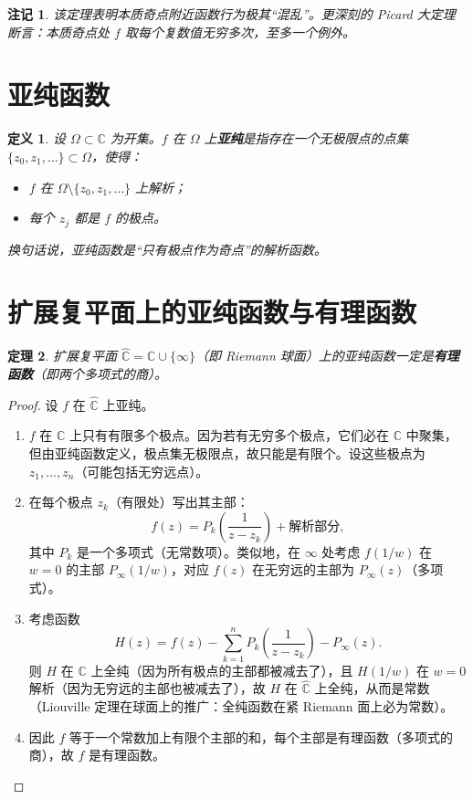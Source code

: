 \documentclass[UTF8]{ctexart}
\newtheorem{theorem}{定理}[section]
\newtheorem{definition}[theorem]{定义}
\newtheorem{remark}{注记}[section]
\numberwithin{equation}{section}
\newcommand{\CC}{\mathbb{C}}
\begin{document}
\begin{remark}
该定理表明本质奇点附近函数行为极其“混乱”。更深刻的 Picard 大定理断言：本质奇点处 \(f\) 取每个复数值无穷多次，至多一个例外。
\end{remark}

\section{亚纯函数}
\begin{definition}
设 \(\Omega\subset\CC\) 为开集。\(f\) 在 \(\Omega\) 上\textbf{亚纯}是指存在一个无极限点的点集 \(\{z_0,z_1,\dots\}\subset\Omega\)，使得：
\begin{itemize}
\item \(f\) 在 \(\Omega\setminus\{z_0,z_1,\dots\}\) 上解析；
\item 每个 \(z_j\) 都是 \(f\) 的极点。
\end{itemize}
换句话说，亚纯函数是“只有极点作为奇点”的解析函数。
\end{definition}

\section{扩展复平面上的亚纯函数与有理函数}
\begin{theorem}
扩展复平面 \(\widehat{\CC}=\CC\cup\{\infty\}\)（即 Riemann 球面）上的亚纯函数一定是\textbf{有理函数}（即两个多项式的商）。
\end{theorem}

\begin{proof}
设 \(f\) 在 \(\widehat{\CC}\) 上亚纯。
\begin{enumerate}
\item \(f\) 在 \(\CC\) 上只有有限多个极点。因为若有无穷多个极点，它们必在 \(\CC\) 中聚集，但由亚纯函数定义，极点集无极限点，故只能是有限个。设这些极点为 \(z_1,\dots,z_n\)（可能包括无穷远点）。
\item 在每个极点 \(z_k\)（有限处）写出其主部：
   \[
   f(z) = P_k\left(\frac{1}{z-z_k}\right) + \text{解析部分},
   \]
   其中 \(P_k\) 是一个多项式（无常数项）。类似地，在 \(\infty\) 处考虑 \(f(1/w)\) 在 \(w=0\) 的主部 \(P_\infty(1/w)\)，对应 \(f(z)\) 在无穷远的主部为 \(P_\infty(z)\)（多项式）。
\item 考虑函数
   \[
   H(z) = f(z) - \sum_{k=1}^n P_k\left(\frac{1}{z-z_k}\right) - P_\infty(z).
   \]
   则 \(H\) 在 \(\CC\) 上全纯（因为所有极点的主部都被减去了），且 \(H(1/w)\) 在 \(w=0\) 解析（因为无穷远的主部也被减去了），故 \(H\) 在 \(\widehat{\CC}\) 上全纯，从而是常数（Liouville 定理在球面上的推广：全纯函数在紧 Riemann 面上必为常数）。
\item 因此 \(f\) 等于一个常数加上有限个主部的和，每个主部是有理函数（多项式的商），故 \(f\) 是有理函数。
\end{enumerate}
\end{proof}
\end{document}
